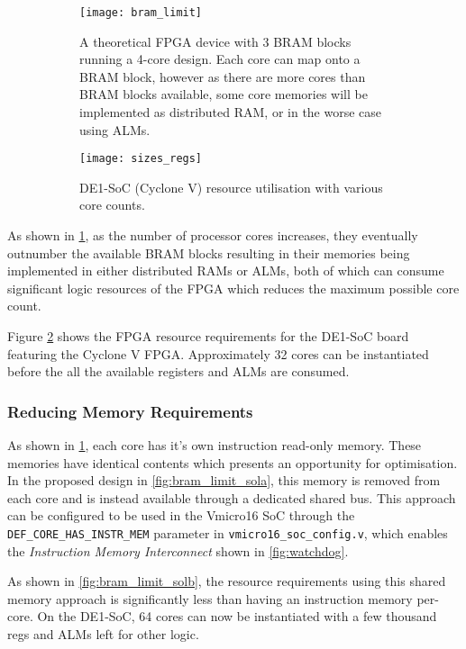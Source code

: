 \begin{figure}[h]
\begin{subfigure}{.5\textwidth}
  \centering
  \texttt{[image: bram\_limit]}
  \caption{A theoretical FPGA device with 3 BRAM blocks running a 4-core design. Each core can map onto a BRAM block, however as there are more cores than BRAM blocks available, some core memories will be implemented as distributed RAM, or in the worse case using ALMs.}
  \label{fig:bram_limita}
\end{subfigure}%
\begin{subfigure}{.5\textwidth}
  \centering
  \texttt{[image: sizes\_regs]}
  \caption{DE1-SoC (Cyclone V) resource utilisation with various core counts.}
  \label{fig:bram_limitb}
\end{subfigure}
\caption{}
\label{fig:bram_limit}
\end{figure}

As shown in \cref{fig:bram_limita}, as the number of processor cores increases, they eventually outnumber the available BRAM blocks resulting in their memories being implemented in either distributed RAMs or ALMs, both of which can consume significant logic resources of the FPGA which reduces the maximum possible core count.

Figure \cref{fig:bram_limitb} shows the FPGA resource requirements for the DE1-SoC board featuring the Cyclone V FPGA. Approximately 32 cores can be instantiated before the all the available registers and ALMs are consumed.

\subsubsection{Reducing Memory Requirements}
\label{sec:anal_memory}
As shown in \cref{fig:bram_limita}, each core has it's own instruction read-only memory. These memories have identical contents which presents an opportunity for optimisation. In the proposed design in \cref{fig:bram_limit_sola}, this memory is removed from each core and is instead available through a dedicated shared bus. This approach can be configured to be used in the Vmicro16 SoC through the \verb|DEF_CORE_HAS_INSTR_MEM| parameter in \verb|vmicro16_soc_config.v|, which enables the \textit{Instruction Memory Interconnect} shown in \cref{fig:watchdog}.

As shown in \cref{fig:bram_limit_solb}, the resource requirements using this shared memory approach is significantly less than having an instruction memory per-core. On the DE1-SoC, 64 cores can now be instantiated with a few thousand regs and ALMs left for other logic.



